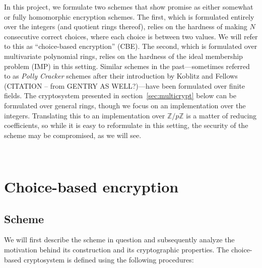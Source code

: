 \documentclass[11pt]{report}
\newcommand{\Z}{\mathbb{Z}}
\begin{document}
In this project, we formulate two schemes that show promise as either somewhat or fully homomorphic encryption schemes. The first,
which is formulated entirely over the integers (and quotient rings thereof), relies on the hardness of making $N$ consecutive correct choices, where each choice
is between two values. We will refer to this as ``choice-based encryption'' (CBE). The second, which is formulated over multivariate polynomial rings, relies on the hardness of the ideal membership problem (IMP) in this
setting. Similar schemes in the past---sometimes referred to as \emph{Polly Cracker} schemes after their introduction by Koblitz and Fellows (CITATION -- from GENTRY AS WELL?)---have been formulated over finite fields. The cryptosystem presented in section~\ref{sec:multicrypt}  below can be formulated over general rings, though we focus on an implementation over the integers. Translating this to an implementation over $\Z/p\Z$ is a matter of reducing coefficients, so while it is easy to reformulate in this setting, the security of the scheme may be compromised, as we will see.

\

\section{Choice-based encryption}

\subsection{Scheme}

We will first describe the scheme in question and subsequently analyze the motivation behind its construction and its cryptographic properties. The choice-based cryptosystem is defined using the following procedures:
\end{document}
